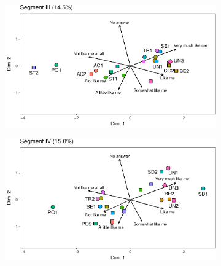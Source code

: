 \documentclass[12pt,letter]{article}\usepackage[]{graphicx}\usepackage[]{xcolor}
\begin{document}
\begin{figure}
\bigskip
\begin{subfigure}{.5\textwidth}
   \includegraphics[width=\textwidth]{figures/Paper-biplots-3-edit2}
\end{subfigure}
\hfill
\begin{subfigure}{.5\textwidth}
   \includegraphics[width=\textwidth]{figures/Paper-biplots-4-edit2}
\end{subfigure} 


\end{figure}
\end{document}

